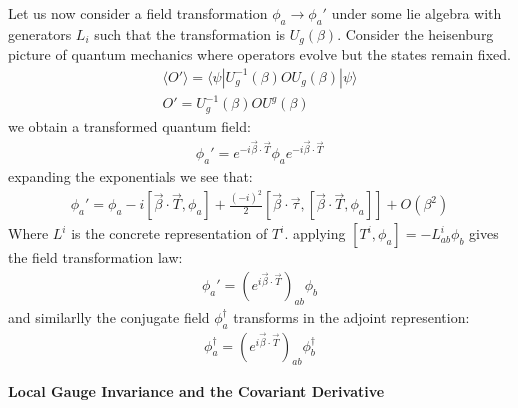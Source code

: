 Let us now consider a field transformation $\phi_a \rightarrow \phi_a'$ under some lie algebra with
generators $L_i$ such that the transformation is $U_g(\beta)$. Consider the heisenburg picture of quantum mechanics where operators evolve but 
the states remain fixed. 
\begin{align*}
\langle O' \rangle = \langle \psi | U_g^{-1}(\beta) O U_g(\beta) | \psi \rangle\\
O'= U_g^{-1}(\beta) O U^g(\beta)
\end{align*}
we obtain a transformed quantum field:
\begin{align*}
\phi_a' = e^{-i \vec \beta \cdot \vec T} \phi_a e^{-i \vec \beta \cdot \vec T}
\end{align*}
expanding the exponentials we see that:
\begin{align*}
\phi_a' = \phi_a - i [ \vec \beta \cdot \vec T, \phi_a] + \frac{(-i)^2}{2}[ \vec \beta \cdot \vec \tau, [ \vec \beta \cdot \vec T, \phi_a]] + O(\beta^2)
\end{align*}
Where $L^i$ is the concrete representation of $T^i$. applying $[T^i, \phi_a] = - L_{ab}^i \phi_b$ gives the field transformation law:
\begin{align*}
\phi_a' = \left (e^{i \vec \beta \cdot \vec T} \right)_{ab} \phi_b 
\end{align*}
and similarlly the conjugate field $\phi^\dagger_a$ transforms in the adjoint represention:
\begin{align*}
\phi_a^\dagger = \left( e^{i \vec \beta \cdot \vec T} \right)_{ab} \phi^\dagger_b 
\end{align*}

\textbf{Local Gauge Invariance and the Covariant Derivative} 

